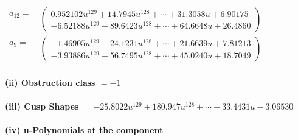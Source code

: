\documentclass[1p]{elsarticle_modified}
\theoremstyle{definition}
\begin{document}
\begin{tabular}{m{7pt} m{180pt} m{7pt} m{180pt} }
\flushright $a_{12}=$&$\begin{pmatrix}0.952102 u^{129}+14.7945 u^{128}+\cdots+31.3058 u+6.90175\\-6.52188 u^{129}+89.6423 u^{128}+\cdots+64.6648 u+26.4860\end{pmatrix}$ \\
\flushright $a_{9}=$&$\begin{pmatrix}-1.46905 u^{129}+24.1231 u^{128}+\cdots+21.6639 u+7.81213\\-3.93886 u^{129}+56.7495 u^{128}+\cdots+45.0240 u+18.7049\end{pmatrix}$\\&\end{tabular}
\flushleft \textbf{(ii) Obstruction class $= -1$}\\~\\
\flushleft \textbf{(iii) Cusp Shapes $= -25.8022 u^{129}+180.947 u^{128}+\cdots-33.4431 u-3.06530$}\\~\\
\newpage\renewcommand{\arraystretch}{1}
\flushleft \textbf{(iv) u-Polynomials at the component}\newline \\
\end{document}
